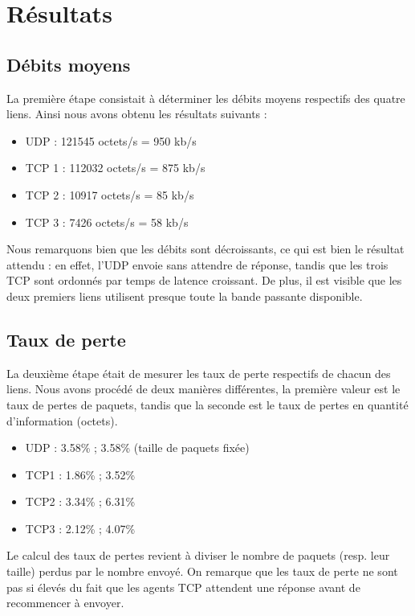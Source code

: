 
\section{R\'esultats}

\subsection{Débits moyens}
La première étape consistait à déterminer les débits moyens respectifs des quatre liens.
Ainsi nous avons obtenu les résultats suivants :
\begin{itemize}
	\item UDP : 121545 octets/s = 950 kb/s
	\item TCP 1 : 112032 octets/s = 875 kb/s
	\item TCP 2 : 10917 octets/s = 85 kb/s
	\item TCP 3 : 7426 octets/s = 58 kb/s
\end{itemize}

Nous remarquons bien que les débits sont décroissants, ce qui est bien le résultat
attendu : en effet, l'UDP envoie sans attendre de réponse, tandis que les trois TCP sont
ordonnés par temps de latence croissant.
De plus, il est visible que les deux premiers liens utilisent presque toute la bande passante
disponible.

\subsection{Taux de perte}
La deuxième étape était de mesurer les taux de perte respectifs de chacun des liens.
Nous avons procédé de deux manières différentes, la première valeur est le taux de pertes
de paquets, tandis que la seconde est le taux de pertes en quantité d'information
(octets).
\begin{itemize}
	\item UDP : 3.58\% ; 3.58\% (taille de paquets fixée)
	\item TCP1 : 1.86\% ; 3.52\%
	\item TCP2 : 3.34\% ; 6.31\%
	\item TCP3 : 2.12\% ; 4.07\%
\end{itemize}
Le calcul des taux de pertes revient à diviser le nombre de paquets (resp. leur taille)
perdus par le nombre envoyé.
On remarque que les taux de perte ne sont pas si élevés du fait que les agents TCP
attendent une réponse avant de recommencer à envoyer.

